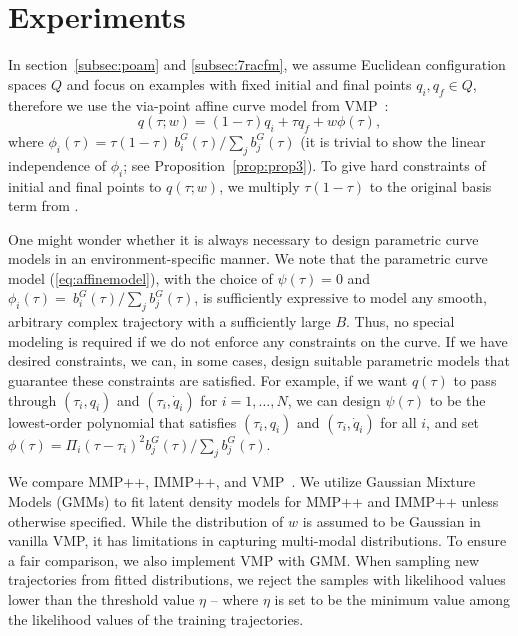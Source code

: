 \section{Experiments}
In section~\ref{subsec:poam} and \ref{subsec:7racfm}, we assume Euclidean configuration spaces $Q$ and focus on examples with fixed initial and final points $q_i, q_f \in Q$, therefore we use the via-point affine curve model from VMP~\cite{zhou2019learning}: 
\begin{equation}
\label{eq:acme}
    q(\tau; w) = (1-\tau)q_i + \tau q_f + w \phi(\tau),
\end{equation}
where $\phi_i(\tau) = \tau(1-\tau) \ b_i^G(\tau) / \sum_{j} b_j^G(\tau)$ (it is trivial to show the linear independence of $\phi_i$; see Proposition~\ref{prop:prop3}).
To give hard constraints of initial and final points to $q(\tau; w)$, we multiply $\tau(1-\tau)$ to the original basis term from \cite{zhou2019learning}. 

One might wonder whether it is always necessary to design parametric curve models in an environment-specific manner. We note that the parametric curve model (\ref{eq:affinemodel}), with the choice of \(\psi(\tau)=0\) and $\phi_i(\tau)=\ b_i^G(\tau) / \sum_{j} b_j^G(\tau)$, is sufficiently expressive to model any smooth, arbitrary complex trajectory with a sufficiently large \(B\). Thus, no special modeling is required if we do not enforce any constraints on the curve.
If we have desired constraints, we can, in some cases, design suitable parametric models that guarantee these constraints are satisfied. For example, if we want \(q(\tau)\) to pass through \((\tau_i, q_i)\) and \((\tau_i, \dot{q}_i)\) for \(i = 1, \ldots, N\), we can design \(\psi(\tau)\) to be the lowest-order polynomial that satisfies \((\tau_i, q_i)\) and \((\tau_i, \dot{q}_i)\) for all \(i\), and set \(\phi(\tau) = \Pi_i (\tau - \tau_i)^2 b^G_j(\tau)/\sum_j b^G_j(\tau)\).

We compare MMP++, IMMP++, and VMP~\cite{zhou2019learning}. We utilize Gaussian Mixture Models (GMMs) to fit latent density models for MMP++ and IMMP++ unless otherwise specified. While the distribution of $w$ is assumed to be Gaussian in vanilla VMP, it has limitations in capturing multi-modal distributions. To ensure a fair comparison, we also implement VMP with GMM. When sampling new trajectories from fitted distributions, we reject the samples with likelihood values lower than the threshold value $\eta$ -- where $\eta$ is set to be the minimum value among the likelihood values of the training trajectories. 

